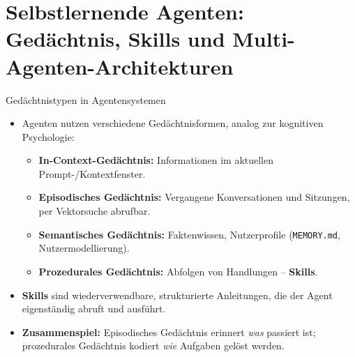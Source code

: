 \documentclass[aspectratio=1610, xcolor=dvipsnames, 9pt]{beamer}
\begin{document}
\section{Selbstlernende Agenten: Gedächtnis, Skills und Multi-Agenten-Architekturen}

\begin{frame}{Gedächtnistypen in Agentensystemen}
  \begin{itemize}
    \item Agenten nutzen verschiedene Gedächtnisformen, analog zur kognitiven Psychologie:
      \begin{itemize}
        \item \textbf{In-Context-Gedächtnis:} Informationen im aktuellen Prompt-/Kontextfenster.
        \item \textbf{Episodisches Gedächtnis:} Vergangene Konversationen und Sitzungen, per Vektorsuche abrufbar.
        \item \textbf{Semantisches Gedächtnis:} Faktenwissen, Nutzerprofile (\texttt{MEMORY.md}, Nutzermodellierung).
        \item \textbf{Prozedurales Gedächtnis:} Abfolgen von Handlungen -- \textbf{Skills}.
      \end{itemize}
    \vspace{0.3cm}
    \item \textbf{Skills} sind wiederverwendbare, strukturierte Anleitungen, die der Agent eigenständig abruft und ausführt.
    \item \textbf{Zusammenspiel:} Episodisches Gedächtnis erinnert \emph{was} passiert ist; prozedurales Gedächtnis kodiert \emph{wie} Aufgaben gelöst werden.
  \end{itemize}
\end{frame}
\end{document}
